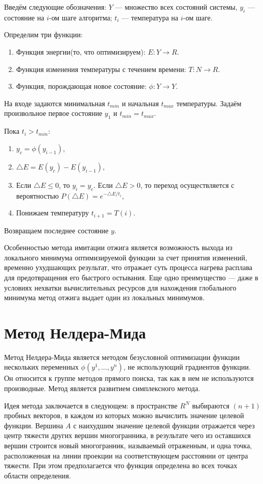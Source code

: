 \documentclass[11pt, oneside, a4paper]{article}
\begin{document}
Введём следующие обозначения: $Y$ --- множество всех состояний системы, $y_i$ --- состояние на $i$-ом шаге алгоритма; $t_i$ --- температура на $i$-ом шаге.


Определим три функции:
\begin{enumerate}
\item Функция энергии(то, что оптимизируем):   $E:Y\rightarrow R$.
\item Функция изменения температуры с течением времени:  
$T:N\rightarrow R$.
\item Функция, порождающая новое состояние:  
$\phi:Y\rightarrow Y$.
\end{enumerate}
На входе задаются минимальная $t_{min} $ и начальная $t_{max}$ температуры. Задаём произвольное первое состояние $y_1$ и $t_{min}=t_{max}$.

Пока $t_i>t_{min}$:
\begin{enumerate}
\item $y_c=\phi(y_{i-1})$,
\item $\triangle E=E(y_c)-E(y_{i-1})$,
\item Если $\triangle E \leq 0$, то $y_i=y_c$. Если $\triangle E >0$, то переход осуществляется с вероятностью $P(\triangle E)=e^{- \triangle E /t_i}$,
\item Понижаем температуру $t_{i+1}=T(i)$.
\end{enumerate}
Возвращаем последнее состояние $y$. 

Особенностью метода имитации отжига является возможность выхода из локального минимума оптимизируемой функции за счет принятия изменений, временно ухудшающих результат, что отражает суть процесса нагрева расплава для предотвращения его быстрого остывания. Еще одно преимущество --- даже в условиях нехватки вычислительных ресурсов для нахождения глобального минимума метод отжига выдает один из локальных минимумов. 

\section{Метод Нелдера-Мида}

Метод Нелдера-Мида является методом безусловной оптимизации \cite{fio_bib19} функции нескольких  переменных $\phi(y^1,...,y^n )$, не использующий градиентов функции. Он относится к группе методов прямого поиска, так как в нем не используются производные. Метод является развитием симплексного метода.
 
Идея метода заключается в следующем: в пространстве $R^N$ выбираются $(n+1)$ пробных векторов, в каждом из которых можно вычислить значение целевой функции. Вершина $A$ с наихудшим значение целевой функции отражается через центр тяжести других вершин многогранника, в результате чего из оставшихся вершин строится новый многогранник, называемый отраженным, и одна точка, расположенная на линии проекции на соответствующем расстоянии от центра тяжести. При этом предполагается что функция определена во всех точках области определения.
\end{document}

